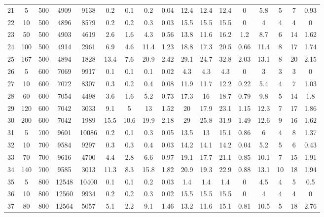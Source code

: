 \documentclass[11pt]{article}
\begin{document}
\begin{landscape}
\begin{longtable}[c]{ccccc|cccc|cccc|cccc}
		\rowcolor[HTML]{EFEFEF} 
		21 & 5 & 500 & 4909 & 9138 & 0.2 & 0.1 & 0.2 & 0.04 & 12.4 & 12.4 & 12.4 & 0 & 5.8 & 5 & 7 & 0.93 \\
		\rowcolor[HTML]{EFEFEF} 
		22 & 10 & 500 & 4896 & 8579 & 0.2 & 0.2 & 0.3 & 0.03 & 15.5 & 15.5 & 15.5 & 0 & 4 & 4 & 4 & 0 \\
		\rowcolor[HTML]{EFEFEF} 
		23 & 50 & 500 & 4903 & 4619 & 2.6 & 1.6 & 4.3 & 0.56 & 13.8 & 11.6 & 16.2 & 1.2 & 8.7 & 6 & 14 & 1.62 \\
		\rowcolor[HTML]{EFEFEF} 
		24 & 100 & 500 & 4914 & 2961 & 6.9 & 4.6 & 11.4 & 1.23 & 18.8 & 17.3 & 20.5 & 0.66 & 11.4 & 8 & 17 & 1.74 \\
		\rowcolor[HTML]{EFEFEF} 
		25 & 167 & 500 & 4894 & 1828 & 13.4 & 7.6 & 20.9 & 2.42 & 29.1 & 24.7 & 32.8 & 2.03 & 13.1 & 8 & 20 & 2.15 \\
		26 & 5 & 600 & 7069 & 9917 & 0.1 & 0.1 & 0.1 & 0.02 & 4.3 & 4.3 & 4.3 & 0 & 3 & 3 & 3 & 0 \\
		27 & 10 & 600 & 7072 & 8307 & 0.3 & 0.2 & 0.4 & 0.08 & 11.9 & 11.7 & 12.2 & 0.22 & 5.4 & 4 & 7 & 1.03 \\
		28 & 60 & 600 & 7054 & 4498 & 3.6 & 1.6 & 5.2 & 0.73 & 17.3 & 16 & 18.7 & 0.79 & 9.8 & 5 & 14 & 1.8 \\
		29 & 120 & 600 & 7042 & 3033 & 9.1 & 5 & 13 & 1.52 & 20 & 17.9 & 23.1 & 1.15 & 12.3 & 7 & 17 & 1.86 \\
		30 & 200 & 600 & 7042 & 1989 & 15.5 & 10.6 & 19.9 & 2.18 & 29 & 25.8 & 31.9 & 1.49 & 12.6 & 9 & 16 & 1.62 \\
		\rowcolor[HTML]{EFEFEF} 
		31 & 5 & 700 & 9601 & 10086 & 0.2 & 0.1 & 0.3 & 0.05 & 13.5 & 13 & 15.1 & 0.86 & 6 & 4 & 8 & 1.37 \\
		\rowcolor[HTML]{EFEFEF} 
		32 & 10 & 700 & 9584 & 9297 & 0.3 & 0.3 & 0.4 & 0.03 & 14.2 & 14.1 & 14.2 & 0.04 & 5.2 & 5 & 6 & 0.43 \\
		\rowcolor[HTML]{EFEFEF} 
		33 & 70 & 700 & 9616 & 4700 & 4.4 & 2.8 & 6.6 & 0.97 & 19.1 & 17.7 & 21.1 & 0.85 & 10.1 & 7 & 15 & 1.91 \\
		\rowcolor[HTML]{EFEFEF} 
		34 & 140 & 700 & 9585 & 3013 & 11.3 & 8.3 & 15.8 & 1.82 & 20.9 & 19.3 & 22.9 & 0.88 & 13.1 & 10 & 18 & 1.94 \\
		35 & 5 & 800 & 12548 & 10400 & 0.1 & 0.1 & 0.2 & 0.03 & 1.4 & 1.4 & 1.4 & 0 & 4.5 & 4 & 5 & 0.5 \\
		36 & 10 & 800 & 12560 & 9934 & 0.2 & 0.2 & 0.3 & 0.02 & 15.5 & 15.5 & 15.5 & 0 & 4 & 4 & 4 & 0 \\
		37 & 80 & 800 & 12564 & 5057 & 5.1 & 2.2 & 9.1 & 1.46 & 13.2 & 11.6 & 15.1 & 0.81 & 10.5 & 5 & 18 & 2.76 \\

\end{longtable}
\end{landscape}
\end{document}
